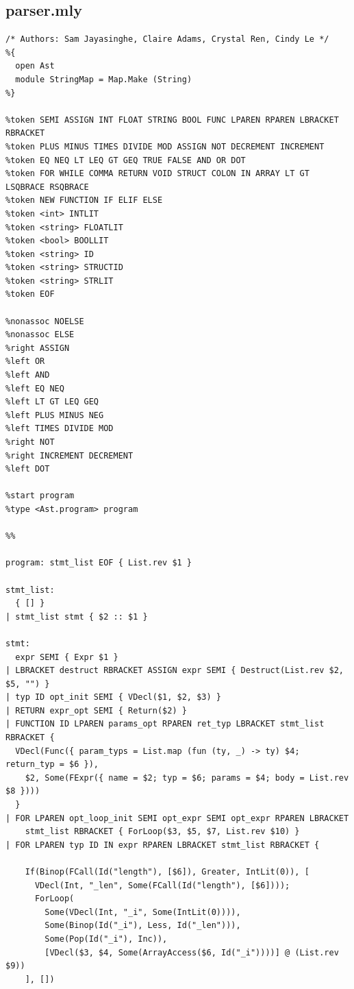 \documentclass[12pt]{article}
\begin{document}
\subsection{parser.mly}
\begin{mdframed}[hidealllines=true,backgroundcolor=blue!20]
\begin{lstlisting}
/* Authors: Sam Jayasinghe, Claire Adams, Crystal Ren, Cindy Le */
%{
  open Ast
  module StringMap = Map.Make (String)
%}

%token SEMI ASSIGN INT FLOAT STRING BOOL FUNC LPAREN RPAREN LBRACKET RBRACKET
%token PLUS MINUS TIMES DIVIDE MOD ASSIGN NOT DECREMENT INCREMENT
%token EQ NEQ LT LEQ GT GEQ TRUE FALSE AND OR DOT
%token FOR WHILE COMMA RETURN VOID STRUCT COLON IN ARRAY LT GT LSQBRACE RSQBRACE
%token NEW FUNCTION IF ELIF ELSE
%token <int> INTLIT
%token <string> FLOATLIT
%token <bool> BOOLLIT
%token <string> ID
%token <string> STRUCTID
%token <string> STRLIT
%token EOF

%nonassoc NOELSE
%nonassoc ELSE
%right ASSIGN
%left OR
%left AND
%left EQ NEQ
%left LT GT LEQ GEQ
%left PLUS MINUS NEG
%left TIMES DIVIDE MOD
%right NOT
%right INCREMENT DECREMENT
%left DOT

%start program
%type <Ast.program> program

%%

program: stmt_list EOF { List.rev $1 }

stmt_list:
  { [] }
| stmt_list stmt { $2 :: $1 }

stmt:
  expr SEMI { Expr $1 }
| LBRACKET destruct RBRACKET ASSIGN expr SEMI { Destruct(List.rev $2, $5, "") }
| typ ID opt_init SEMI { VDecl($1, $2, $3) }
| RETURN expr_opt SEMI { Return($2) }
| FUNCTION ID LPAREN params_opt RPAREN ret_typ LBRACKET stmt_list RBRACKET {
  VDecl(Func({ param_typs = List.map (fun (ty, _) -> ty) $4; return_typ = $6 }), 
    $2, Some(FExpr({ name = $2; typ = $6; params = $4; body = List.rev $8 })))
  }
| FOR LPAREN opt_loop_init SEMI opt_expr SEMI opt_expr RPAREN LBRACKET 
    stmt_list RBRACKET { ForLoop($3, $5, $7, List.rev $10) }
| FOR LPAREN typ ID IN expr RPAREN LBRACKET stmt_list RBRACKET {

    If(Binop(FCall(Id("length"), [$6]), Greater, IntLit(0)), [
      VDecl(Int, "_len", Some(FCall(Id("length"), [$6])));
      ForLoop(
        Some(VDecl(Int, "_i", Some(IntLit(0)))),
        Some(Binop(Id("_i"), Less, Id("_len"))),
        Some(Pop(Id("_i"), Inc)),
        [VDecl($3, $4, Some(ArrayAccess($6, Id("_i"))))] @ (List.rev $9))
    ], [])
  

\end{lstlisting}
\end{mdframed}
\end{document}
